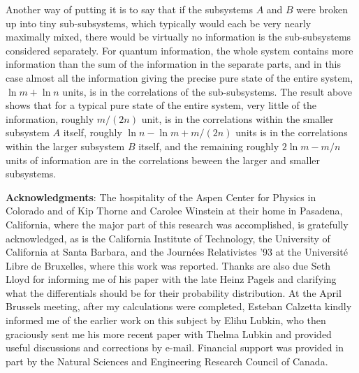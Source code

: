 \documentclass[12pt]{article}
\begin{document}
Another way of putting it is to say that if the subsystems $A$ and
$B$ were
broken up into tiny sub-subsystems, which typically would each be
very nearly
maximally mixed, there would be virtually no information is the
sub-subsystems
considered separately.  For quantum information, the whole system
contains more
information than the sum of the information in the separate parts,
and in this
case almost all the information giving the precise pure state of the
entire
system, $\ln m+\ln n$ units, is in the correlations of the
sub-subsystems.  The
result above shows that for a typical pure state of the entire
system, very
little of the information, roughly $m/(2n)$ unit, is in the
correlations within
the smaller subsystem $A$ itself, roughly $\ln n -\ln m +m/(2n)$
units is in
the
correlations within the larger subsystem $B$ itself, and the
remaining roughly
$2\ln m -m/n$ units of information are in the correlations beween the
larger
and
smaller subsystems.

{\bf Acknowledgments}:  The hospitality of the Aspen Center for
Physics in
Colorado and of Kip Thorne and Carolee Winstein at their home in
Pasadena,
California, where the major part of this research was accomplished,
is
gratefully acknowledged, as is the California Institute of
Technology, the
University of California at Santa Barbara, and the Journ\'{e}es
Relativistes
'93 at the Universit\'{e} Libre de Bruxelles, where this work was
reported.
Thanks are also due Seth Lloyd for informing me of his paper with the
late
Heinz Pagels and clarifying what the differentials should be for
their
probability distribution.  At the April Brussels meeting, after my
calculations
were completed, Esteban Calzetta kindly informed me of  the earlier
work on
this subject by Elihu Lubkin, who then graciously sent me his more
recent paper
with Thelma Lubkin and provided useful discussions and corrections by
e-mail.
Financial support was provided in part by the
Natural Sciences and Engineering Research Council of Canada.
\end{document}
